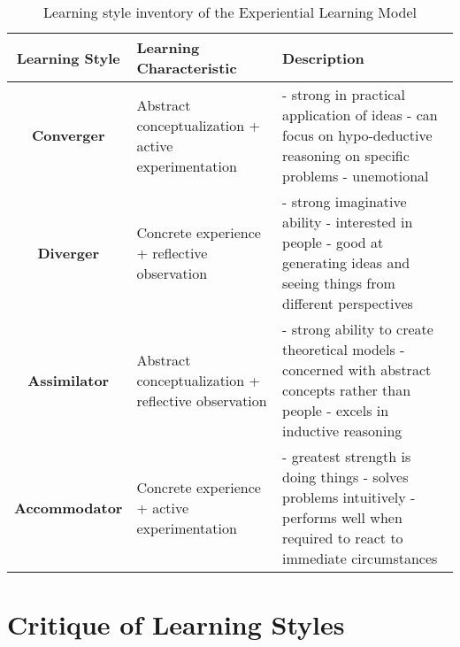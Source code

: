 \documentclass[12pt]{article}
\begin{document}
\begin{singlespacing}
    \begin{table}[H]
        \begin{tabular}{|c|p{5cm}|p{6cm}|}
            \hline
            \textbf{Learning Style} & \textbf{Learning Characteristic} & \textbf{Description} \\ \hline
            \textbf{Converger} & Abstract conceptualization + active experimentation &
            - strong in practical application of ideas \newline
            - can focus on hypo-deductive reasoning on specific problems \newline
            - unemotional \\ \hline
            \textbf{Diverger} & Concrete experience + reflective observation &
            - strong imaginative ability \newline
            - interested in people \newline
            - good at generating ideas and seeing things from different perspectives \\ \hline
            \textbf{Assimilator} & Abstract conceptualization + reflective observation &
            - strong ability to create theoretical models \newline
            - concerned with abstract concepts rather than people \newline
            - excels in inductive reasoning \\ \hline
            \textbf{Accommodator} & Concrete experience + active experimentation &
            - greatest strength is doing things \newline
            - solves problems intuitively \newline
            - performs well when required to react to immediate circumstances \\ \hline
        \end{tabular}
        \caption{Learning style inventory of the Experiential Learning Model}
    \end{table}
\end{singlespacing}

\section{Critique of Learning Styles}
\end{document}
